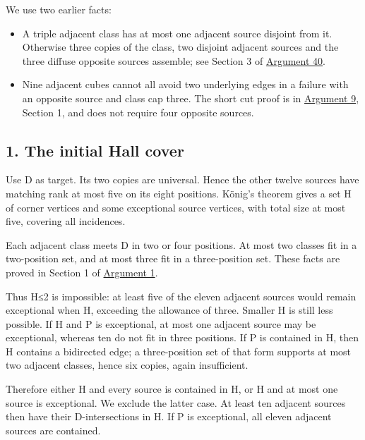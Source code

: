 \documentclass[
  10pt,
]{article}
\providecommand{\tightlist}{%
  \setlength{\itemsep}{0pt}\setlength{\parskip}{0pt}}
\begin{document}
We use two earlier facts:

\begin{itemize}
\tightlist
\item
  A triple adjacent class has at most one adjacent source disjoint from
  it. Otherwise three copies of the class, two disjoint adjacent sources
  and the three diffuse opposite sources assemble; see Section 3 of
  \protect\hyperlink{arg-40}{Argument 40}.
\item
  Nine adjacent cubes cannot all avoid two underlying edges in a failure
  with an opposite source and class cap three. The short cut proof is in
  \protect\hyperlink{arg-9}{Argument 9}, Section 1, and does not require
  four opposite sources.
\end{itemize}

\hypertarget{the-initial-hall-cover}{%
\subsection*{1. The initial Hall cover}\label{the-initial-hall-cover}}

Use D as target. Its two copies are universal. Hence the other twelve
sources have matching rank at most five on its eight positions. König's
theorem gives a set H of corner vertices and some exceptional source
vertices, with total size at most five, covering all incidences.

Each adjacent class meets D in two or four positions. At most two
classes fit in a two-position set, and at most three fit in a
three-position set. These facts are proved in Section 1 of
\protect\hyperlink{arg-1}{Argument 1}.

Thus \textbar H\textbar≤2 is impossible: at least five of the eleven
adjacent sources would remain exceptional when \textbar H,
exceeding the allowance of three. Smaller H is still less possible. If
\textbar H and P is exceptional, at most one adjacent source
may be exceptional, whereas ten do not fit in three positions. If P is
contained in H, then H contains a bidirected edge; a three-position set
of that form supports at most two adjacent classes, hence six copies,
again insufficient.

Therefore either \textbar H and every source is contained in
H, or \textbar H and at most one source is exceptional. We
exclude the latter case. At least ten adjacent sources then have their
D-intersections in H. If P is exceptional, all eleven adjacent sources
are contained.
\end{document}
